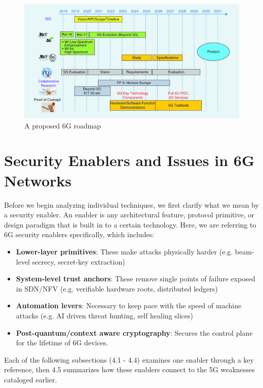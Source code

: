 \documentclass[acmtog]{acmart}
\begin{document}
\begin{figure}[h]
  \centering
  \includegraphics[width=\linewidth]{6G_roadmap.png}
  \caption{A proposed 6G roadmap \cite{ref4}}
\end{figure}

\section{Security Enablers and Issues in 6G Networks}

Before we begin analyzing individual techniques, we first clarify what we mean by a security enabler. An enabler is any architectural feature, protocol primitive, or design paradigm that is built in to a certain technology. Here, we are referring to 6G security enablers specifically, which includes:
\begin{itemize}
  \item \textbf{Lower-layer primitives}: These make attacks physically harder (e.g. beam-level secrecy, secret-key extraction)
  \item \textbf{System-level trust anchors}: These remove single points of failure exposed in SDN/NFV (e.g. verifiable hardware roots, distributed ledgers)
  \item \textbf{Automation levers}: Necessary to keep pace with the speed of machine attacks (e.g. AI driven threat hunting, self healing slices)
  \item \textbf{Post-quantum/context aware cryptography}: Secures the control plane for the lifetime of 6G devices.
\end{itemize}

Each of the following subsections (4.1 - 4.4) examines one enabler through a key reference, then 4.5 summarizes how these enablers connect to the 5G weaknesses cataloged earlier.
\end{document}
